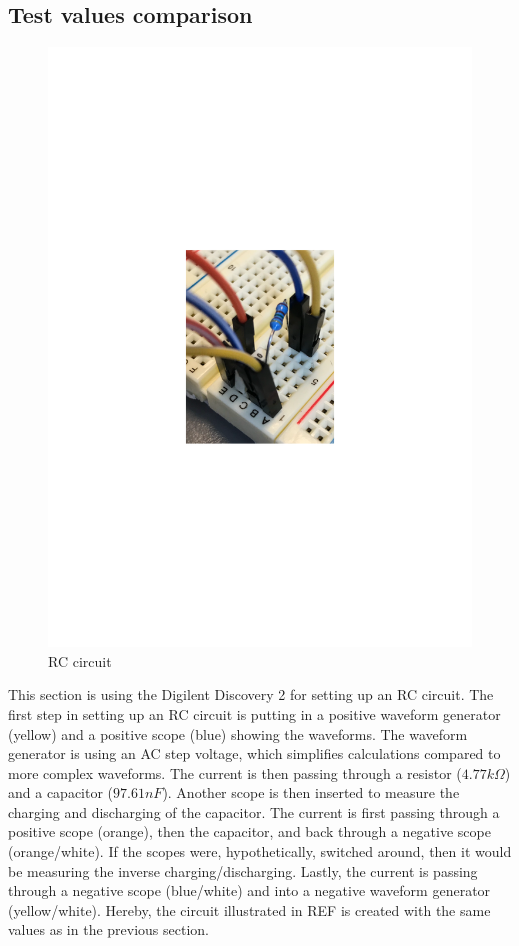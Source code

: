 \subsection{Test values comparison}
\begin{figure}[H]
	\center
		\includegraphics[clip, trim=7cm 11cm 7cm 11cm, scale=1]{fig/img/an_dis_RC}
	\caption{RC circuit}
\end{figure}
This section is using the Digilent Discovery 2 for setting up an RC circuit. The first step in setting up an RC circuit is putting in a positive waveform generator (yellow) and a positive scope (blue) showing the waveforms. The waveform generator is using an AC step voltage, which simplifies calculations compared to more complex waveforms. The current is then passing through a resistor ($4.77 k\Omega$) and a capacitor ($97.61 nF$). Another scope is then inserted to measure the charging and discharging of the capacitor. The current is first passing through a positive scope (orange), then the capacitor, and back through a negative scope (orange/white). If the scopes were, hypothetically, switched around, then it would be measuring the inverse charging/discharging. Lastly, the current is passing through a negative scope (blue/white) and into a negative waveform generator (yellow/white). Hereby, the circuit illustrated in REF is created with the same values as in the previous section. \\ \\
